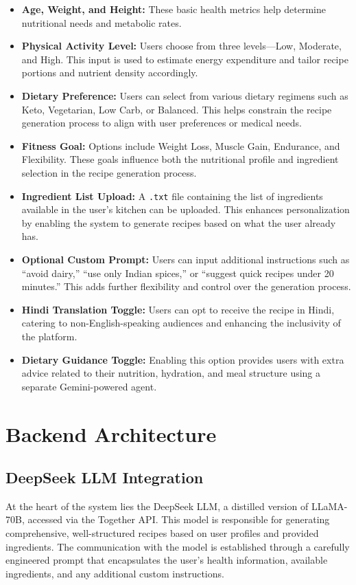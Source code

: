 \documentclass[letterpaper,11pt]{report}
\begin{document}
\begin{itemize}
  \item \textbf{Age, Weight, and Height:} These basic health metrics help determine nutritional needs and metabolic rates.
  \item \textbf{Physical Activity Level:} Users choose from three levels—Low, Moderate, and High. This input is used to estimate energy expenditure and tailor recipe portions and nutrient density accordingly.
  \item \textbf{Dietary Preference:} Users can select from various dietary regimens such as Keto, Vegetarian, Low Carb, or Balanced. This helps constrain the recipe generation process to align with user preferences or medical needs.
  \item \textbf{Fitness Goal:} Options include Weight Loss, Muscle Gain, Endurance, and Flexibility. These goals influence both the nutritional profile and ingredient selection in the recipe generation process.
  \item \textbf{Ingredient List Upload:} A \texttt{.txt} file containing the list of ingredients available in the user’s kitchen can be uploaded. This enhances personalization by enabling the system to generate recipes based on what the user already has.
  \item \textbf{Optional Custom Prompt:} Users can input additional instructions such as “avoid dairy,” “use only Indian spices,” or “suggest quick recipes under 20 minutes.” This adds further flexibility and control over the generation process.
  \item \textbf{Hindi Translation Toggle:} Users can opt to receive the recipe in Hindi, catering to non-English-speaking audiences and enhancing the inclusivity of the platform.
  \item \textbf{Dietary Guidance Toggle:} Enabling this option provides users with extra advice related to their nutrition, hydration, and meal structure using a separate Gemini-powered agent.
\end{itemize}

\section{Backend Architecture}

\subsection{DeepSeek LLM Integration}

At the heart of the system lies the DeepSeek LLM, a distilled version of LLaMA-70B, accessed via the Together API. This model is responsible for generating comprehensive, well-structured recipes based on user profiles and provided ingredients. The communication with the model is established through a carefully engineered prompt that encapsulates the user’s health information, available ingredients, and any additional custom instructions.
\end{document}
